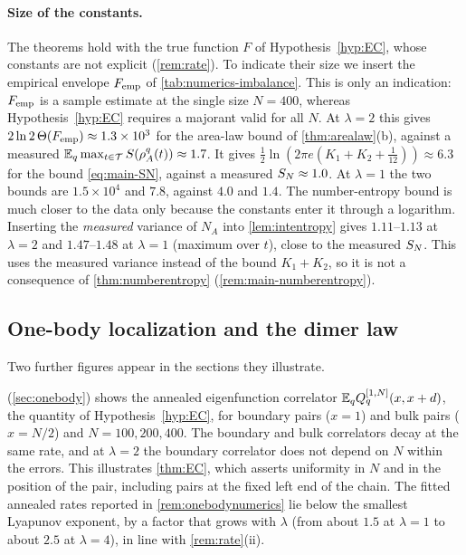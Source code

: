 \paragraph{Size of the constants.}  The theorems hold with the true function $F$ of Hypothesis~\ref{hyp:EC}, whose
constants are not explicit (\cref{rem:rate}).  To indicate their size we insert the empirical envelope $F_{\mathrm{emp}}$ of
\cref{tab:numerics-imbalance}.  This is only an indication: $F_{\mathrm{emp}}$ is a sample estimate at the single size $N=400$,
whereas Hypothesis~\ref{hyp:EC} requires a majorant valid for all $N$.  At $\lambda=2$ this gives $2\ln2\,\Theta(F_{\mathrm{emp}})\approx1.3\times10^3$ for the
area-law bound of \cref{thm:arealaw}(b), against a measured $\mathbb{E}_q\max_{t\in\mathcal T}S(\rho^q_A(t))\approx1.7$.  It gives
$\frac12\ln(2\pi e(K_1+K_2+\frac1{12}))\approx6.3$ for the bound \eqref{eq:main-SN}, against a measured $S_{N}\approx1.0$.
At $\lambda=1$ the two bounds are $1.5\times10^4$ and $7.8$, against $4.0$ and $1.4$.  The number-entropy bound is much
closer to the data only because the constants enter it through a logarithm.  Inserting the \emph{measured} variance of
$N_A$ into \cref{lem:intentropy} gives $1.11$--$1.13$ at $\lambda=2$ and $1.47$--$1.48$ at $\lambda=1$ (maximum over $t$),
close to the measured $S_{N}$.  This uses the measured variance instead of the bound $K_1+K_2$, so it is not a consequence
of \cref{thm:numberentropy} (\cref{rem:main-numberentropy}).

\subsection{One-body localization and the dimer law}\label{sec:numerics:other}

Two further figures appear in the sections they illustrate.

 (\cref{sec:onebody}) shows the annealed eigenfunction correlator $\mathbb{E}_qQ^{[1,N]}_q(x,x+d)$, the
quantity of Hypothesis~\ref{hyp:EC}, for boundary pairs ($x=1$) and bulk pairs ($x=N/2$) and $N=100,200,400$.  The
boundary and bulk correlators decay at the same rate, and at $\lambda=2$ the boundary correlator does not depend on $N$
within the errors.  This illustrates \cref{thm:EC}, which asserts uniformity in $N$ and in the position of the pair,
including pairs at the fixed left end of the chain.  The fitted annealed rates reported in \cref{rem:onebodynumerics} lie
below the smallest Lyapunov exponent, by a factor that grows with $\lambda$ (from about $1.5$ at $\lambda=1$ to about
$2.5$ at $\lambda=4$), in line with \cref{rem:rate}(ii).

